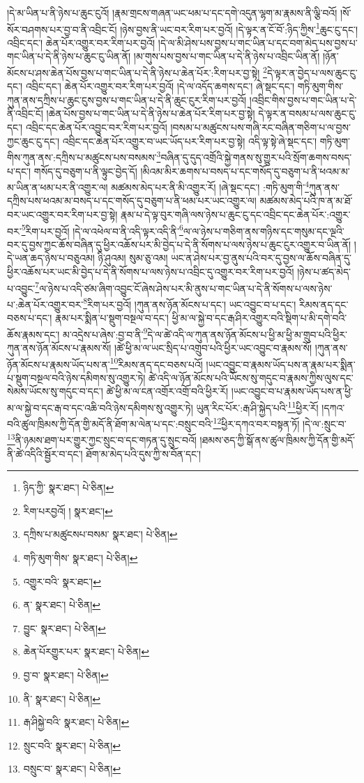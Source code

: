 །དེ་མ་ཡིན་པ་ནི་ཉེས་པ་ཆུང་ངུའོ། །རྣམ་གྲངས་གཞན་ཡང་ཕམ་པ་དང་དགེ་འདུན་ལྷག་མ་རྣམས་ནི་ལྕི་བའོ། །སོ་སོར་བཤགས་པར་བྱ་བ་ནི་འབྲིང་ངོ། །ཉེས་བྱས་ནི་ཡང་བར་རིག་པར་བྱའོ། །དེ་ལྟར་ན་ངོ་བོ་:ཉིད་ཀྱིས་\footnote{ཉིད་ཀྱི་  སྣར་ཐང་།  པེ་ཅིན། }ཆུང་ངུ་དང་། འབྲིང་དང་། ཆེན་པོར་འགྱུར་བར་རིག་པར་བྱའོ། །དེ་ལ་མི་ཤེས་པས་བྱས་པ་གང་ཡིན་པ་དང་བག་མེད་པས་བྱས་པ་གང་ཡིན་པ་དེ་ནི་ཉེས་པ་ཆུང་ངུ་ཡིན་ནོ། །མ་གུས་པས་བྱས་པ་གང་ཡིན་པ་དེ་ནི་ཉེས་པ་འབྲིང་ཡིན་ནོ། །ཉོན་མོངས་པ་ཤས་ཆེན་པོས་བྱས་པ་གང་ཡིན་པ་དེ་ནི་ཉེས་པ་ཆེན་པོར་:རིག་པར་བྱ་སྟེ། \footnote{རིག་པརབྱའོ། །   སྣར་ཐང་། }དེ་ལྟར་ན་བྱེད་པ་ལས་ཆུང་ངུ་དང་། འབྲིང་དང་། ཆེན་པོར་འགྱུར་བར་རིག་པར་བྱའོ། །དེ་ལ་འདོད་ཆགས་དང་། ཞེ་སྡང་དང་། གཏི་མུག་གིས་ཀུན་ནས་དཀྲིས་པ་ཆུང་ངུས་བྱས་པ་གང་ཡིན་པ་དེ་ནི་ཆུང་ངུར་རིག་པར་བྱའོ། །འབྲིང་གིས་བྱས་པ་གང་ཡིན་པ་དེ་ནི་འབྲིང་ངོ། །ཆེན་པོས་བྱས་པ་གང་ཡིན་པ་དེ་ནི་ཉེས་པ་ཆེན་པོར་རིག་པར་བྱ་སྟེ། དེ་ལྟར་ན་བསམ་པ་ལས་ཆུང་ངུ་དང་། འབྲིང་དང་ཆེན་པོར་འབྱུང་བར་རིག་པར་བྱའོ། །བསམ་པ་མཚུངས་པས་གཞི་རང་བཞིན་གཅིག་པ་ལ་བྱས་ཀྱང་ཆུང་ངུ་དང་། འབྲིང་དང་ཆེན་པོར་འགྱུར་བ་ཡང་ཡོད་པར་རིག་པར་བྱ་སྟེ། འདི་ལྟ་སྟེ་ཞེ་སྡང་དང་། གཏི་མུག་གིས་ཀུན་ནས་:དཀྲིས་པ་མཚུངས་པས་བསམས་\footnote{དཀྲིས་པ་མཚུངསཔ་བསམ་  སྣར་ཐང་།  པེ་ཅིན། }བཞིན་དུ་དུད་འགྲོའི་སྐྱེ་གནས་སུ་གྱུར་པའི་སྲོག་ཆགས་བསད་པ་དང་། གསོད་དུ་བཅུག་པ་ནི་ལྟུང་བྱེད་དོ། །མིའམ་མིར་ཆགས་པ་བསད་པ་དང་གསོད་དུ་བཅུག་པ་ནི་ཕའམ་མ་མ་ཡིན་ན་ཕམ་པར་ནི་འགྱུར་ལ། མཚམས་མེད་པར་ནི་མི་འགྱུར་རོ། །ཞེ་སྡང་དང་། :གཏི་མུག་གི་\footnote{གཏི་མུག་གིས་  སྣར་ཐང་།  པེ་ཅིན། }ཀུན་ནས་དཀྲིས་པས་ཕའམ་མ་བསད་པ་དང་གསོད་དུ་བཅུག་པ་ནི་ཕམ་པར་ཡང་འགྱུར་ལ། མཚམས་མེད་པའི་ཁ་ན་མ་ཐོ་བར་ཡང་འགྱུར་བར་རིག་པར་བྱ་སྟེ། རྣམ་པ་དེ་ལྟ་བུར་གཞི་ལས་ཉེས་པ་ཆུང་ངུ་དང་འབྲིང་དང་ཆེན་པོར་:འགྱུར་བར་\footnote{འགྱུར་བའི་  སྣར་ཐང་། }རིག་པར་བྱའོ། །དེ་ལ་འཕེལ་བ་ནི་འདི་ལྟར་འདི་ནི་\footnote{ན་  སྣར་ཐང་།  པེ་ཅིན། }ལ་ལ་ཉེས་པ་གཅིག་ནས་གཉིས་དང་གསུམ་དང་ལྔའི་བར་དུ་བྱས་ཀྱང་ཆོས་བཞིན་དུ་ཕྱིར་འཆོས་པར་མི་བྱེད་པ་དེ་ནི་སོགས་པ་ལས་ཉེས་པ་ཆུང་ངུར་འགྱུར་བ་ཡིན་ནོ། །དེ་ཡན་ཆད་ཉེས་པ་བཅུའམ། ཉི་ཤུའམ། སུམ་ཅུ་འམ། ཡང་ན་ཤེས་པར་བྱ་ནུས་པའི་བར་དུ་བྱས་ལ་ཆོས་བཞིན་དུ་ཕྱིར་འཆོས་པར་ཡང་མི་བྱེད་པ་དེ་ནི་སོགས་པ་ལས་ཉེས་པ་འབྲིང་དུ་འགྱུར་བར་རིག་པར་བྱའོ། །ཉེས་པ་ཚད་མེད་པ་འབྱུང་\footnote{བྱུང་  སྣར་ཐང་།  པེ་ཅིན། }ལ་ཉེས་པ་འདི་ཙམ་ཞིག་འབྱུང་ངོ་ཞེས་ཤེས་པར་མི་ནུས་པ་གང་ཡིན་པ་དེ་ནི་སོགས་པ་ལས་ཉེས་པ་:ཆེན་པོར་འགྱུར་བར་\footnote{ཆེན་པོརགྱུར་པར་  སྣར་ཐང་།  པེ་ཅིན། }རིག་པར་བྱའོ། །ཀུན་ནས་ཉོན་མོངས་པ་དང་། ཡང་འབྱུང་བ་པ་དང་། རིམས་ནད་དང་བཅས་པ་དང་། རྣམ་པར་སྨིན་པ་སྡུག་བསྔལ་བ་དང་། ཕྱི་མ་ལ་སྐྱེ་བ་དང་རྒ་ཤིར་འགྱུར་བའི་སྡིག་པ་མི་དགེ་བའི་ཆོས་རྣམས་དང་། མ་འདྲེས་པ་ཞེས་:བྱ་བ་ནི་\footnote{བྱ་བ་  སྣར་ཐང་།  པེ་ཅིན། }དེ་ལ་ཚེ་འདི་ལ་ཀུན་ནས་ཉོན་མོངས་པ་ཕྱི་མ་ཕྱི་མ་གྲུབ་པའི་ཕྱིར་ཀུན་ནས་ཉོན་མོངས་པ་རྣམས་སོ། །ཚེ་ཕྱི་མ་ལ་ཡང་སྲིད་པ་འགྲུབ་པའི་ཕྱིར་ཡང་འབྱུང་བ་རྣམས་སོ། །ཀུན་ནས་ཉོན་མོངས་པ་རྣམས་ཡོད་པས་ན་\footnote{ནི་  སྣར་ཐང་།  པེ་ཅིན། }རིམས་ནད་དང་བཅས་པའོ། །ཡང་འབྱུང་བ་རྣམས་ཡོད་པས་ན་རྣམ་པར་སྨིན་པ་སྡུག་བསྔལ་བའི་ཉེས་དམིགས་སུ་འགྱུར་ཏེ། ཚེ་འདི་ལ་ཉོན་མོངས་པའི་ཡོངས་སུ་གདུང་བ་རྣམས་ཀྱིས་ལུས་དང་སེམས་ཡོངས་སུ་གདུང་བ་དང་། ཚེ་ཕྱི་མ་ལ་ངན་འགྲོར་འགྲོ་བའི་ཕྱིར་རོ། །ཡང་འབྱུང་བ་པ་རྣམས་ཡོད་པས་ན་ཕྱི་མ་ལ་སྐྱེ་བ་དང་རྒ་བ་དང་འཆི་བའི་ཉེས་དམིགས་སུ་འགྱུར་ཏེ། ཡུན་རིང་པོར་:རྒ་ཤི་སྐྱེད་པའི་\footnote{རྒ་ཤིསྐྱེ་བའི་  སྣར་ཐང་།  པེ་ཅིན། }ཕྱིར་རོ། །དཀའ་བའི་ཚུལ་ཁྲིམས་ཀྱི་དོན་གྱི་མདོ་ནི་ཐོག་མ་ལེན་པ་དང་:བསྲུང་བའི་\footnote{སྲུང་བའི་  སྣར་ཐང་།  པེ་ཅིན། }ཕྱིར་དཀའ་བར་བསྟན་ཏོ། །དེ་ལ་:སྲུང་བ་\footnote{བསྲུང་བ་  སྣར་ཐང་།  པེ་ཅིན། }ནི་ཉམས་ཐག་པར་གྱུར་ཀྱང་སྲུང་བ་དང་གཏན་དུ་སྲུང་བའོ། །ཐམས་ཅད་ཀྱི་སྒོ་ནས་ཚུལ་ཁྲིམས་ཀྱི་དོན་གྱི་མདོ་ནི་ཚེ་འདིའི་སྦྱོར་བ་དང་། ཐོག་མ་མེད་པའི་དུས་ཀྱི་ས་བོན་དང་། 
